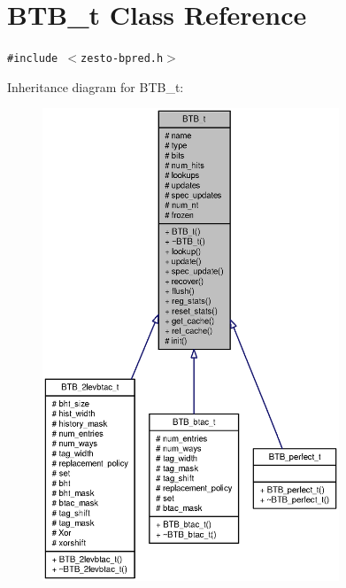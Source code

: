 \section{BTB\_\-t Class Reference}
\label{classBTB__t}
{\tt \#include $<$zesto-bpred.h$>$}

Inheritance diagram for BTB\_\-t:\nopagebreak
\begin{figure}[H]
\begin{center}
\leavevmode
\includegraphics[height=400pt]{classBTB__t__inherit__graph}
\end{center}
\end{figure}
